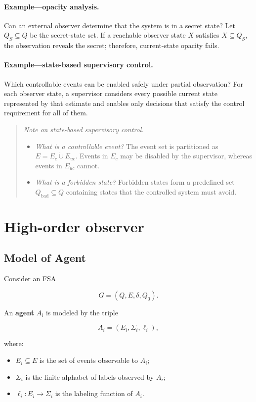 \documentclass[11pt]{article}
\begin{document}
\paragraph{Example---opacity analysis.}
Can an external observer determine that the system is in a secret state? Let $Q_S\subseteq Q$ be the secret-state set. If a reachable observer state $X$ satisfies $X\subseteq Q_S$, the observation reveals the secret; therefore, current-state opacity fails.

\paragraph{Example---state-based supervisory control.}
Which controllable events can be enabled safely under partial observation? For each observer state, a supervisor considers every possible current state represented by that estimate and enables only decisions that satisfy the control requirement for all of them.

\begin{quote}
\textit{Note on state-based supervisory control.}
\begin{itemize}
\item \textit{What is a controllable event?} The event set is partitioned as $E=E_c\mathbin{\dot\cup}E_{uc}$. Events in $E_c$ may be disabled by the supervisor, whereas events in $E_{uc}$ cannot.
\item \textit{What is a forbidden state?} Forbidden states form a predefined set $Q_{\mathrm{bad}}\subseteq Q$ containing states that the controlled system must avoid.
\end{itemize}
\end{quote}

\section{High-order observer}

\subsection{Model of Agent}

Consider an FSA

\[
G=(Q,E,\delta,Q_0).
\]

An \textbf{agent} $A_i$ is modeled by the triple

\[
A_i=(E_i,\Sigma_i,\ell_i),
\]

where:

\begin{itemize}
\item $E_i\subseteq E$ is the set of events observable to $A_i$;
\item $\Sigma_i$ is the finite alphabet of labels observed by $A_i$;
\item $\ell_i:E_i\rightarrow\Sigma_i$ is the labeling function of $A_i$.
\end{itemize}
\end{document}
